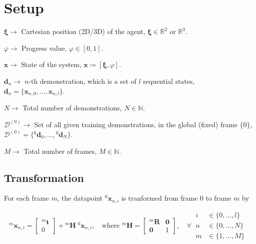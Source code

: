 \section{Setup}

\( \boldsymbol{\xi} \to \) Cartesian position (2D/3D) of the agent, \( \boldsymbol{\xi} \in \mathbb{R}^2 \) or \( \mathbb{R}^3 \).

\( \varphi \to \) Progress value, \( \varphi \in [0, 1] \).

\( \boldsymbol{x} \to \) State of the system, \( \boldsymbol{x} \coloneq [\boldsymbol{\xi}, \varphi] \).

\( \boldsymbol{d}_n \to \) \( n \)-th demonstration, which is a set of \( l \) sequential states, \( \boldsymbol{d}_n = \{ \boldsymbol{x}_{n, 0}, \ldots, \boldsymbol{x}_{n, l} \} \).

\( N \to \) Total number of demonstrations, \( N \in \mathbb{N} \).

\( \mathcal{D}^{(0)} \to \) Set of all given training demonstrations, in the global (fixed) frame \( \{ 0 \} \), \( \mathcal{D}^{(0)} = \{ {}^{0}\boldsymbol{d}_0, \ldots, {}^{0}\boldsymbol{d}_N \} \).

\( M \to \) Total number of frames, \( M \in \mathbb{N} \).

\subsection{Transformation}

For each frame \( m \), the datapoint \( {}^{0}\boldsymbol{x}_{n, i} \) is tranformed from frame \( 0 \) to frame \( m \) by

\begin{equation}
    {}^{m}\boldsymbol{x}_{n, i}
    =
    \begin{bmatrix}
        {}^{m}\boldsymbol{t} \\
        0
    \end{bmatrix}
    +
    {}^{m}\boldsymbol{H} \; {}^{0}\boldsymbol{x}_{n, i}
    , \quad
    \text{where }
    {}^{m}\boldsymbol{H}
    =
    \begin{bmatrix}
        {}^{m}\boldsymbol{R} & \boldsymbol{0} \\
        \boldsymbol{0}       & 1
    \end{bmatrix}
    , \quad \forall \
    \begin{aligned}
        i & \in \{ 0, \ldots, l \} \\
        n & \in \{ 0, \ldots, N \} \\
        m & \in \{ 1, \ldots, M \}
    \end{aligned}
\end{equation}

